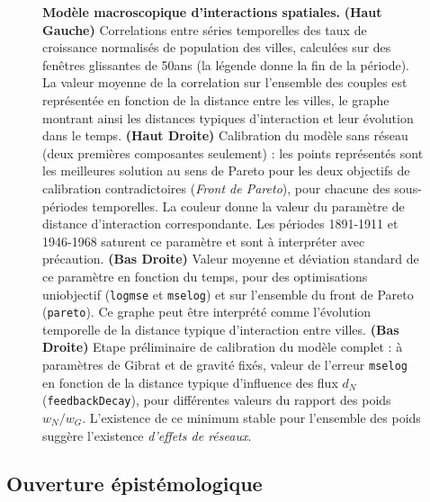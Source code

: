 \begin{figure}
\caption{\textbf{Modèle macroscopique d'interactions spatiales.} \textbf{(Haut Gauche)} Correlations entre séries temporelles des taux de croissance normalisés de population des villes, calculées sur des fenêtres glissantes de 50ans (la légende donne la fin de la période). La valeur moyenne de la correlation sur l'ensemble des couples est représentée en fonction de la distance entre les villes, le graphe montrant ainsi les distances typiques d'interaction et leur évolution dans le temps. \textbf{(Haut Droite)} Calibration du modèle sans réseau (deux premières composantes seulement) : les points représentés sont les meilleures solution au sens de Pareto pour les deux objectifs de calibration contradictoires (\emph{Front de Pareto}), pour chacune des sous-périodes temporelles. La couleur donne la valeur du paramètre de distance d'interaction correspondante. Les périodes 1891-1911 et 1946-1968 saturent ce paramètre et sont à interpréter avec précaution. \textbf{(Bas Droite)} Valeur moyenne et déviation standard de ce paramètre en fonction du temps, pour des optimisations uniobjectif (\texttt{logmse} et \texttt{mselog}) et sur l'ensemble du front de Pareto (\texttt{pareto}). Ce graphe peut être interprété comme l'évolution temporelle de la distance typique d'interaction entre villes. \textbf{(Bas Droite)} Etape préliminaire de calibration du modèle complet : à paramètres de Gibrat et de gravité fixés, valeur de l'erreur \texttt{mselog} en fonction de la distance typique d'influence des flux $d_N$ (\texttt{feedbackDecay}), pour différentes valeurs du rapport des poids $w_N/w_G$. L'existence de ce minimum stable pour l'ensemble des poids suggère l'existence \emph{d'effets de réseaux}.}
\label{fig:macro}
\end{figure}


\subsection{Ouverture épistémologique}

